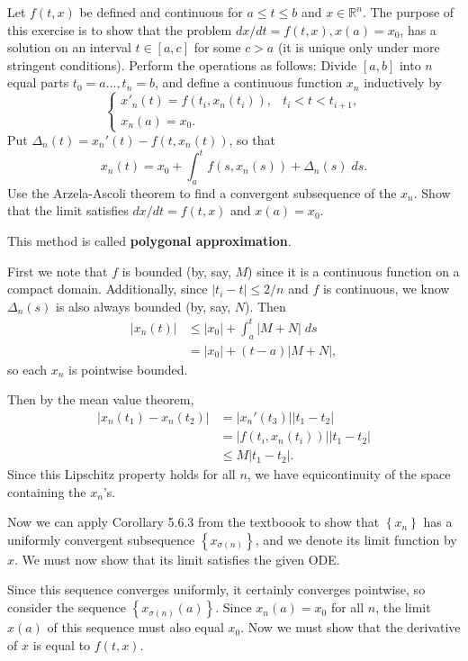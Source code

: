 \documentclass[10pt]{amsart}
\newenvironment{exercise}[1]{%
        \vspace{10mm}
        \renewcommand\themanualtheoreminner{#1}%
  \manualtheoreminner
}\hrulefill{\endmanualtheoreminner}
\begin{document}
\begin{exercise}{Page 322, Ex. 46}
	Let $f(t,x)$ be defined and continuous for $a \leq t \leq b$ and $x \in \mathbb{R}^n$. The purpose of this exercise is to show that the problem $dx/dt = f(t,x), x(a)=x_0$, has a solution on an interval $t \in [a,c]$ for some $c>a$ (it is unique only under more stringent conditions). Perform the operations as follows: Divide $[a,b]$ into $n$ equal parts $t_0=a\dots,t_n=b$, and define a continuous function $x_n$ inductively by
	\[
	\begin{cases}
		x'_n(t) = f(t_i, x_n(t_i)), & t_i < t < t_{i+1},\\
		x_n(a) = x_0.
	\end{cases}
\] Put $\Delta_n(t) = x_n'(t) - f(t,x_n(t))$, so that
\[
	x_n(t) = x_0+\int_{a}^{t} f(s,x_n(s))+\Delta_n(s) \;ds.
\] Use the Arzela-Ascoli theorem to find a convergent subsequence of the $x_n$. Show that the limit satisfies $dx/dt = f(t,x)$ and $x(a)=x_0$.

This method is called \textbf{polygonal approximation}.
\end{exercise}

First we note that $f$ is bounded (by, say, $M$) since it is a continuous function on a compact domain. Additionally, since $|t_i - t| \leq 2/n$ and $f$ is continuous, we know $\Delta_n(s)$ is also always bounded (by, say, $N$). Then
\begin{align*}
	|x_n(t)| &\leq |x_0| + \int_{a}^{t} |M+N| \;ds \\
		 &= |x_0| + (t-a)|M+N|,
\end{align*}
so each $x_n$ is pointwise bounded.

Then by the mean value theorem,
\begin{align*}
	|x_n(t_1) - x_n(t_2)| &= |x_n'(t_3)| |t_1-t_2| \\
			      &= |f(t_i, x_n(t_i))| |t_1-t_2| \\
			      &\leq M |t_1-t_2|.
\end{align*}
Since this Lipschitz property holds for all $n$, we have equicontinuity of the space containing the $x_n$'s.

Now we can apply Corollary 5.6.3 from the textboook to show that $\left\{ x_n \right\}$ has a uniformly convergent subsequence $\left\{ x_{\sigma(n)} \right\}$, and we denote its limit function by $x$. We must now show that its limit satisfies the given ODE.

Since this sequence converges uniformly, it certainly converges pointwise, so consider the sequence $\left\{ x_{\sigma(n)}(a) \right\}$. Since $x_n(a) = x_0$ for all $n$, the limit $x(a)$ of this sequence must also equal $x_0$. Now we must show that the derivative of $x$ is equal to $f(t,x)$.
\end{document}
